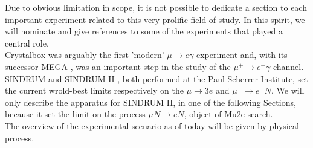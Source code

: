 \documentclass[12pt,a4paper,openright, oneside, titlepage]{book} %
\begin{document}
\noindent Due to obvious limitation in scope, it is not possible to dedicate a section to each important experiment related to this very prolific field of study. 
In this spirit, we will nominate and give references to some of the experiments that played a central role. \\
Crystalbox \cite{Crystalbox:1984} \cite{Crystalbox:1988} was arguably the first 'modern' $\mu\rightarrow e\gamma$ experiment and, with its successor MEGA \cite{MEGA:1999} \cite{MEGA:2002}, was an important step in the study of the $\mu^+\rightarrow e^+\gamma$ channel. 
SINDRUM \cite{SINDRUM} and SINDRUM II \cite{SINDRUMII}, both performed at the Paul Scherrer Institute, set the current wrold-best limits respectively on the $\mu \rightarrow 3 e$ and $\mu^-\rightarrow e^- N$. 
We will only describe the apparatus for SINDRUM II, in one of the following Sections, because it set the limit on the process $\mu N \rightarrow e N$, object of Mu2e search.\\
The overview of the experimental scenario as of today will be given by physical process.
\end{document}
